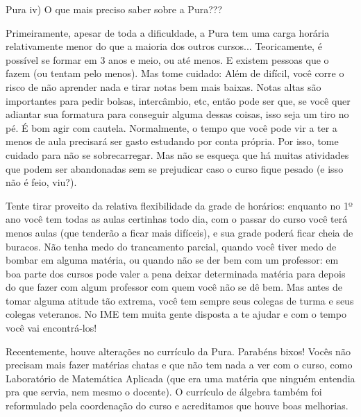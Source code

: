 \begin{subsecao}{Pura}
iv) O que mais preciso saber sobre a Pura???

Primeiramente, apesar de toda a dificuldade, a Pura tem uma carga horária
relativamente menor do que a maioria dos outros cursos... Teoricamente, é
possível se formar em 3 anos e meio, ou até menos. E existem pessoas que o
fazem (ou tentam pelo menos). Mas tome cuidado: Além de difícil, você
corre o risco de não aprender nada e tirar notas bem mais baixas. Notas altas
são importantes para pedir bolsas, intercâmbio, etc, então pode ser que, se você
quer adiantar sua formatura para conseguir alguma dessas coisas, isso seja um
tiro no pé. É bom agir com cautela. Normalmente, o tempo que você pode vir a ter
a menos de aula precisará ser gasto estudando por conta própria. Por isso, tome
cuidado para não se sobrecarregar. Mas não se esqueça que há muitas atividades
que podem ser abandonadas sem se prejudicar caso o curso fique pesado (e isso não é feio, viu?).

Tente tirar proveito da relativa flexibilidade da grade de horários: enquanto
no 1º ano você tem todas as aulas certinhas todo dia, com o passar do
curso você terá menos aulas (que tenderão a ficar mais difíceis), e sua
grade poderá ficar cheia de buracos. Não tenha medo do trancamento parcial,
quando você tiver medo de bombar em alguma matéria, ou quando não se der bem com
um professor: em boa parte dos cursos pode valer a pena deixar determinada
matéria para depois do que fazer com algum professor com quem você não se dê
bem. Mas antes de tomar alguma atitude tão extrema, você tem sempre seus colegas
de turma e seus colegas veteranos. No IME tem muita gente disposta a te ajudar e
com o tempo você vai encontrá-los!



Recentemente, houve alterações no currículo da Pura. Parabéns bixos! Vocês não
precisam mais fazer matérias chatas e que não tem nada a ver com o curso, como
Laboratório de Matemática Aplicada (que era uma matéria que ninguém entendia 
pra que servia, nem mesmo o docente). O currículo de álgebra também foi 
reformulado pela coordenação do curso e acreditamos que houve boas melhorias.


\end{subsecao}

